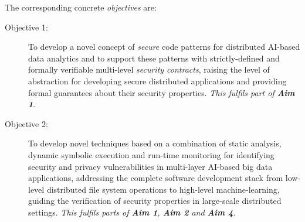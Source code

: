 \documentclass[a4paper,11pt]{article}
\begin{document}
The corresponding concrete \emph{objectives} are: 
\begin{description}

 
\item[Objective 1:] To develop a novel concept of \emph{secure} code patterns for distributed AI-based data analytics and to support these
patterns with strictly-defined and formally verifiable multi-level 
\emph{security contracts}, raising the level of abstraction
for developing secure distributed applications and providing formal guarantees about their security properties. 
\emph{This fulfils part of \textbf{Aim 1}}. 

\item[Objective 2:] To develop novel techniques based on a combination of static analysis, dynamic symbolic execution and run-time monitoring for identifying security and privacy vulnerabilities in multi-layer AI-based big data applications, addressing the complete software development stack from low-level distributed file system operations to high-level machine-learning, guiding the verification of security properties in large-scale distributed settings. \emph{This fulfils parts of \textbf{Aim 1}, \textbf{Aim 2} and \textbf{Aim 4}}.
  

\end{description}
\end{document}

